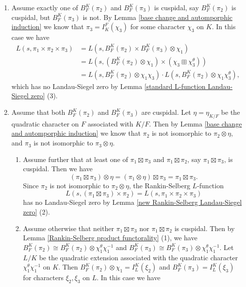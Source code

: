 \documentclass[12pt]{amsart}
\begin{document}
\begin{enumerate}
    \item Assume exactly one of $B_F^K(\pi_2)$ and $B_F^K(\pi_3)$ is cuspidal, say $B_F^K(\pi_2)$ is cuspidal, but $B_F^K(\pi_3)$ is not. By Lemma \ref{base change and automporphic induction} we know that $\pi_3 = I_K^F(\chi_3)$ for some character $\chi_3$ on $K$. In this case we have  
    \begin{align*}
        L(s,\pi_1 \times \pi_2 \times \pi_3) &= L(s,B_F^K(\pi_2) \times B_F^K(\pi_3) \otimes \chi_1) \\
        &= L(s,(B_F^K(\pi_2) \otimes \chi_1) \times (\chi_3 \boxplus \chi_3^\theta)) \\ 
            &= L(s,B_F^K(\pi_2) \otimes \chi_1\chi_3) \cdot L(s,B_F^K(\pi_2) \otimes \chi_1\chi_3^\theta),
    \end{align*}
    which has no Landau-Siegel zero by Lemma \ref{standard L-function Landau-Siegel zero} (3).
    \item Assume that both $B_F^K(\pi_2)$ and $B_F^K(\pi_3)$ are cuspidal. Let $\eta = \eta_{K/F}$ be the quadratic character on $F$ associated with $K/F$. Then by Lemma \ref{base change and automporphic induction} we know that $\pi_2$ is not isomorphic to $\pi_2 \otimes \eta$, and $\pi_3$ is not isomorphic to $\pi_3 \otimes \eta$.
    \begin{enumerate}
        \item Assume further that at least one of $\pi_1 \boxtimes \pi_3$ and $\pi_1 \boxtimes \pi_2$, say $\pi_1 \boxtimes \pi_3$, is cuspidal. Then we have 
        $$(\pi_1 \boxtimes \pi_3) \otimes \eta = (\pi_1 \otimes \eta) \boxtimes \pi_3 = \pi_1 \boxtimes \pi_3.$$
        Since $\pi_2$ is not isomorphic to $\pi_2 \otimes \eta$, the Rankin-Selberg $L$-function
        $$L(s,(\pi_1 \boxtimes \pi_3) \times \pi_2) = L(s,\pi_1 \times \pi_2 \times \pi_3)$$
        has no Landau-Siegel zero by Lemma \ref{new Rankin-Selberg Landau-Siegel zero} (2).
        \item Assume otherwise that neither $\pi_1 \boxtimes \pi_3$ nor $\pi_1 \boxtimes \pi_2$ is cuspidal. Then by Lemma \ref{Rankin-Selberg product functorality} (1), we have $B_F^K(\pi_2) \cong B_F^K(\pi_2) \otimes \chi_1^{\theta}\chi_1^{-1}$ and $B_F^K(\pi_3) \cong B_F^K(\pi_3) \otimes \chi_1^\theta\chi_1^{-1}$. Let $L/K$ be the quadratic extension associated with the quadratic character $\chi_1^\theta\chi_1^{-1}$ on $K$. Then $B_F^K(\pi_2) \otimes \chi_1 = I_L^K(\xi_2)$ and $B_F^K(\pi_3) = I_L^K(\xi_3)$ for characters $\xi_2,\xi_3$ on $L$. In this case we have 

\end{enumerate}
\end{enumerate}
\end{document}
